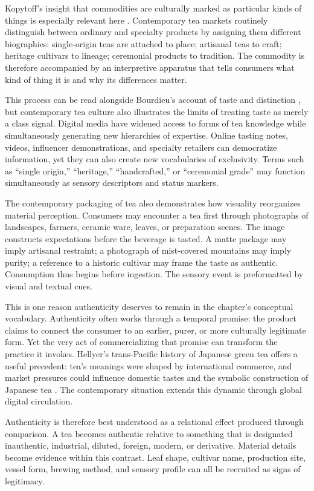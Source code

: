 \documentclass[numbers]{IntechOpen-Book}
\begin{document}
Kopytoff's insight that commodities are culturally marked as particular kinds of things is especially relevant here \cite{kopytoff}. Contemporary tea markets routinely distinguish between ordinary and specialty products by assigning them different biographies: single-origin teas are attached to place; artisanal teas to craft; heritage cultivars to lineage; ceremonial products to tradition. The commodity is therefore accompanied by an interpretive apparatus that tells consumers what kind of thing it is and why its differences matter.

This process can be read alongside Bourdieu's account of taste and distinction \cite{bourdieu}, but contemporary tea culture also illustrates the limits of treating taste as merely a class signal. Digital media have widened access to forms of tea knowledge while simultaneously generating new hierarchies of expertise. Online tasting notes, videos, influencer demonstrations, and specialty retailers can democratize information, yet they can also create new vocabularies of exclusivity. Terms such as ``single origin,'' ``heritage,'' ``handcrafted,'' or ``ceremonial grade'' may function simultaneously as sensory descriptors and status markers.

The contemporary packaging of tea also demonstrates how visuality reorganizes material perception. Consumers may encounter a tea first through photographs of landscapes, farmers, ceramic ware, leaves, or preparation scenes. The image constructs expectations before the beverage is tasted. A matte package may imply artisanal restraint; a photograph of mist-covered mountains may imply purity; a reference to a historic cultivar may frame the taste as authentic. Consumption thus begins before ingestion. The sensory event is preformatted by visual and textual cues.

This is one reason authenticity deserves to remain in the chapter's conceptual vocabulary. Authenticity often works through a temporal promise: the product claims to connect the consumer to an earlier, purer, or more culturally legitimate form. Yet the very act of commercializing that promise can transform the practice it invokes. Hellyer's trans-Pacific history of Japanese green tea offers a useful precedent: tea's meanings were shaped by international commerce, and market pressures could influence domestic tastes and the symbolic construction of Japanese tea \cite{hellyer}. The contemporary situation extends this dynamic through global digital circulation.

Authenticity is therefore best understood as a relational effect produced through comparison. A tea becomes authentic relative to something that is designated inauthentic, industrial, diluted, foreign, modern, or derivative. Material details become evidence within this contrast. Leaf shape, cultivar name, production site, vessel form, brewing method, and sensory profile can all be recruited as signs of legitimacy.
\end{document}
